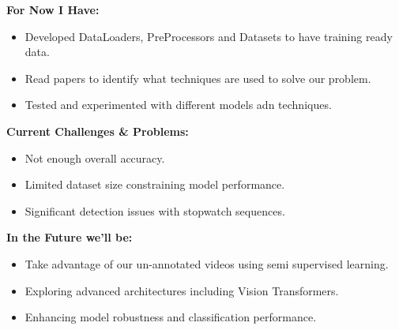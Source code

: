\begin{frame}
    \textbf{For Now I Have:}
    \begin{itemize}
        \item Developed DataLoaders, PreProcessors and Datasets to have training ready data.
        \item Read papers to identify what techniques are used to solve our problem.
        \item Tested and experimented with different models adn techniques.
    \end{itemize}

    \textbf{Current Challenges \& Problems:}
    \begin{itemize}
        \item Not enough overall accuracy.
        \item Limited dataset size constraining model performance.
        \item Significant detection issues with stopwatch sequences.
    \end{itemize}

    \textbf{In the Future we'll be:}
    \begin{itemize}
        \item Take advantage of our un-annotated videos using semi supervised learning.
        \item Exploring advanced architectures including Vision Transformers.
        \item Enhancing model robustness and classification performance.
    \end{itemize}
\end{frame}

